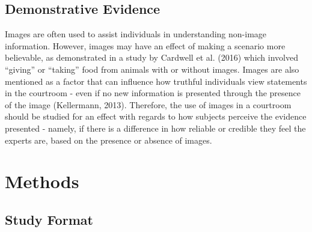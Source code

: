\documentclass[print]{nuthesis}
\begin{document}
\hypertarget{demonstrative-evidence-1}{%
\subsection{Demonstrative Evidence}\label{demonstrative-evidence-1}}

Images are often used to assist individuals in understanding non-image information.
However, images may have an effect of making a scenario more believable, as demonstrated in a study by Cardwell et al. (2016) which involved ``giving'' or ``taking'' food from animals with or without images.
Images are also mentioned as a factor that can influence how truthful individuals view statements in the courtroom - even if no new information is presented through the presence of the image (Kellermann, 2013).
Therefore, the use of images in a courtroom should be studied for an effect with regards to how subjects perceive the evidence presented - namely, if there is a difference in how reliable or credible they feel the experts are, based on the presence or absence of images.

\hypertarget{methods}{%
\section{Methods}\label{methods}}

\hypertarget{study-format}{%
\subsection{Study Format}\label{study-format}}
\end{document}
